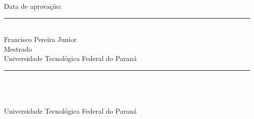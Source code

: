 
\begin{folhadeaprovacao}

    \begin{center}
        \large\bfseries\MakeUppercase{\imprimirautor}
    \end{center}

    \vspace*{30pt}

    \begin{center}
        \ABNTEXchapterfont\large\MakeUppercase{\imprimirtitulo}
    \end{center}

    \vspace*{30pt}

    \begin{flushright}
        \begin{minipage}{.5\textwidth}
            \SingleSpacing
            \small\imprimirpreambulo
        \end{minipage}
    \end{flushright}

    \vspace*{25pt}

    \begin{center}
        Data de aprovação: \underline{\hspace{4cm}}
    \end{center}

    \vspace*{35pt}

    \begin{center}
        \rule{10cm}{0.4pt}\\[4pt]
        Francisco Pereira Junior\\
        Mestrado\\
        Universidade Tecnológica Federal do Paraná
    \end{center}

    \vspace*{20pt}

    \begin{center}
        \rule{10cm}{0.4pt}\\[4pt]
        \underline{\hspace{6cm}}\\
        \underline{\hspace{3cm}}\\
        Universidade Tecnológica Federal do Paraná
    \end{center}


\end{folhadeaprovacao}
